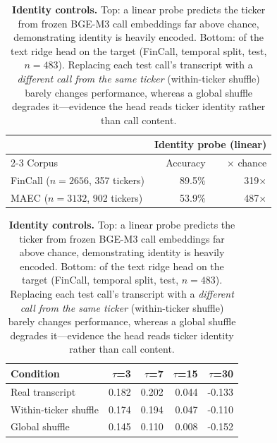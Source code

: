 \begin{table}[t]
\centering
\small
\begin{tabular}{lrr}
\toprule
& \multicolumn{2}{c}{Identity probe (linear)} \\
\cmidrule(lr){2-3}
Corpus & Accuracy & $\times$ chance \\
\midrule
FinCall ($n{=}2656$, 357 tickers) & 89.5\% & 319$\times$ \\
MAEC ($n{=}3132$, 902 tickers)    & 53.9\% & 487$\times$ \\
\bottomrule
\end{tabular}

\vspace{0.6em}

\begin{tabular}{lrrrr}
\toprule
Condition & $\tau$=3 & $\tau$=7 & $\tau$=15 & $\tau$=30 \\
\midrule
Real transcript      & 0.182 & 0.202 & 0.044 & -0.133 \\
Within-ticker shuffle & 0.174 & 0.194 & 0.047 & -0.110 \\
Global shuffle        & 0.145 & 0.110 & 0.008 & -0.152 \\
\bottomrule
\end{tabular}
\caption{\textbf{Identity controls.} Top: a linear probe predicts the ticker from
frozen BGE-M3 call embeddings far above chance, demonstrating identity is heavily
encoded. Bottom: \Rtwo{} of the text ridge head on the \dv{} target
(FinCall, temporal split, test, $n{=}483$). Replacing each test call's transcript
with a \emph{different call from the same ticker} (within-ticker shuffle) barely
changes performance, whereas a global shuffle degrades it---evidence the head reads
ticker identity rather than call content.}
\label{tab:controls}
\end{table}
